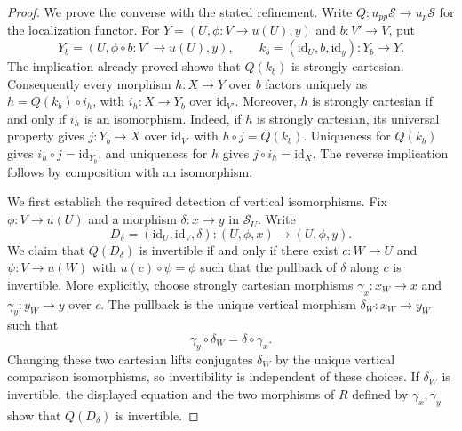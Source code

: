 \begin{proof}
\medskip\noindent
We prove the converse with the stated refinement. Write
$Q : u_{pp}\mathcal{S} \to u_p\mathcal{S}$ for the localization functor.
For $Y = (U, \phi : V \to u(U), y)$ and $b : V' \to V$, put
$$
Y_b = (U, \phi \circ b : V' \to u(U), y),\qquad
k_b = (\text{id}_U, b, \text{id}_y) : Y_b \to Y.
$$
The implication already proved shows that $Q(k_b)$ is strongly cartesian.
Consequently every morphism $h : X \to Y$ over $b$ factors uniquely as
$h = Q(k_b) \circ i_h$, with $i_h : X \to Y_b$ over $\text{id}_{V'}$.
Moreover, $h$ is strongly cartesian if and only if $i_h$ is an isomorphism.
Indeed, if $h$ is strongly cartesian, its universal property gives
$j : Y_b \to X$ over $\text{id}_{V'}$ with $h \circ j = Q(k_b)$.
Uniqueness for $Q(k_b)$ gives $i_h \circ j = \text{id}_{Y_b}$, and
uniqueness for $h$ gives $j \circ i_h = \text{id}_X$.
The reverse implication follows by composition with an isomorphism.

\medskip\noindent
We first establish the required detection of vertical isomorphisms.
Fix $\phi : V \to u(U)$ and a morphism $\delta : x \to y$ in
$\mathcal{S}_U$. Write
$$
D_\delta = (\text{id}_U, \text{id}_V, \delta) :
(U,\phi,x) \longrightarrow (U,\phi,y).
$$
We claim that $Q(D_\delta)$ is invertible if and only if there exist
$c : W \to U$ and $\psi : V \to u(W)$ with $u(c) \circ \psi = \phi$
such that the pullback of $\delta$ along $c$ is invertible.
More explicitly, choose strongly cartesian morphisms
$\gamma_x : x_W \to x$ and $\gamma_y : y_W \to y$ over $c$.
The pullback is the unique vertical morphism $\delta_W : x_W \to y_W$
such that
$$
\gamma_y \circ \delta_W = \delta \circ \gamma_x.
$$
Changing these two cartesian lifts conjugates $\delta_W$ by the unique
vertical comparison isomorphisms, so invertibility is independent of
these choices. If $\delta_W$ is invertible, the displayed equation and
the two morphisms of $R$ defined by $\gamma_x,\gamma_y$ show that
$Q(D_\delta)$ is invertible.


\end{proof}

